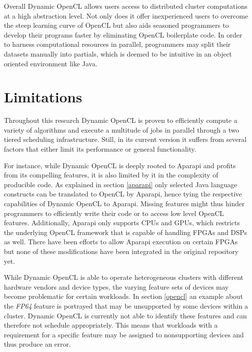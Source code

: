 Overall Dynamic OpenCL allows users access to distributed cluster computations at a high abstraction level. Not only does it offer inexperienced users to overcome the steep learning curve of OpenCL but also aids seasoned programmers to develop their programs faster by eliminating OpenCL boilerplate code. In order to harness computational resources in parallel, programmers may split their datasets manually into partials, which is deemed to be intuitive in an object oriented environment like Java.

\section{Limitations}

Throughout this research Dynamic OpenCL is proven to efficiently compute a variety of algorithms and  execute a multitude of jobs in parallel through a two tiered scheduling infrastructure. Still, in its current version it suffers from several factors that either limit its performance or general functionality.

For instance, while Dynamic OpenCL is deeply rooted to Aparapi and profits from its compelling features, it is also limited by it in the complexity of producible code. As explained in section \ref{aparapi} only selected Java language constructs can be translated to OpenCL by Aparapi, hence tying the respective capabilities of Dynamic OpenCL to Aparapi. Missing features might thus hinder programmers to efficiently write their code or to access low level OpenCL features. Additionally, Aparapi only supports CPUs and GPUs, which restricts the underlying OpenCL framework that is capable of handling FPGAs and DSPs as well. There have been efforts to allow Aparapi execution on certain FPGAs but none of these modifications have been integrated in the original repository yet\cite{aparapi_ucores}.

While Dynamic OpenCL is able to operate heterogeneous clusters with different hardware vendors and device types, the varying feature sets of devices may become problematic for certain workloads. In section \ref{opencl} an example about the \textit{FP64} feature is portrayed that may be unsupported by some devices within a cluster. Dynamic OpenCL is currently not able to identify these features and can therefore not schedule appropriately. This means that workloads with a requirement for a specific feature may be assigned to nonsupporting devices and thus produce an error.


